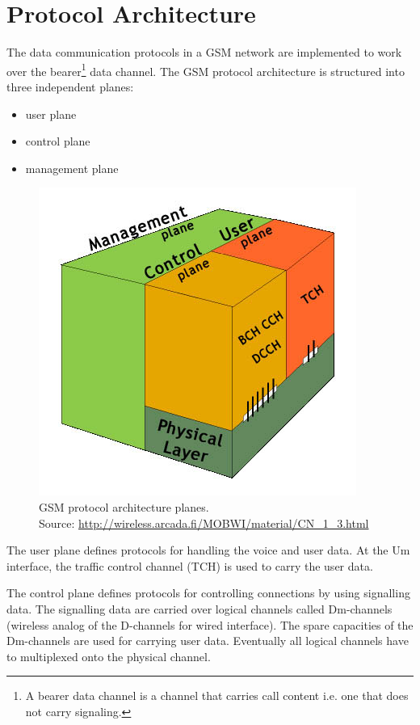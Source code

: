 \section{Protocol Architecture}
The data communication protocols in a GSM network are implemented to work over the bearer\footnote{A bearer data channel is a channel that carries call content i.e.
one that does not carry signaling.} data channel. 
The GSM protocol architecture is structured into three independent planes:
\begin{itemize}
 \item user plane
 \item control plane
 \item management plane
\end{itemize}
\begin{figure}
\centering
\includegraphics[scale=0.7]{gsmPlanes}
\caption[GSM protocol architecture planes]{GSM protocol architecture planes.\\
\footnotesize{Source: \url{http://wireless.arcada.fi/MOBWI/material/CN\_1\_3.html}}}
\end{figure}

The user plane defines protocols for handling the voice and user data. 
At the Um interface, the traffic control channel (TCH) is used to carry the user data.


The control plane defines protocols for controlling connections by using signalling data.
The signalling data are carried over logical channels called Dm-channels (wireless analog of the D-channels for wired interface).
The spare capacities of the Dm-channels are used for carrying user data.
Eventually all logical channels have to multiplexed onto the physical channel.


